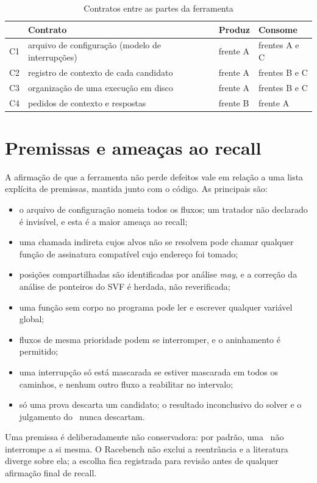 \begin{table}[htb]
  \centering
  \caption{Contratos entre as partes da ferramenta}
  \label{tab:contratos}
  \begin{tabular}{@{}llll@{}}
    \toprule
    & Contrato & Produz & Consome \\
    \midrule
    C1 & arquivo de configuração (modelo de interrupções) & frente A & frentes A e C \\
    C2 & registro de contexto de cada candidato & frente A & frentes B e C \\
    C3 & organização de uma execução em disco & frente A & frentes B e C \\
    C4 & pedidos de contexto e respostas & frente B & frente A \\
    \bottomrule
  \end{tabular}
\end{table}

\section{Premissas e ameaças ao recall}
\label{sec:premissas}

A afirmação de que a ferramenta não perde defeitos vale em relação a uma lista
explícita de premissas, mantida junto com o código. As principais são:

\begin{itemize}
  \item o arquivo de configuração nomeia todos os fluxos; um tratador não
    declarado é invisível, e esta é a maior ameaça ao recall;
  \item uma chamada indireta cujos alvos não se resolvem pode chamar qualquer
    função de assinatura compatível cujo endereço foi tomado;
  \item posições compartilhadas são identificadas por análise \textit{may}, e a
    correção da análise de ponteiros do SVF é herdada, não reverificada;
  \item uma função sem corpo no programa pode ler e escrever qualquer variável
    global;
  \item fluxos de mesma prioridade podem se interromper, e o aninhamento é
    permitido;
  \item uma interrupção só está mascarada se estiver mascarada em todos os
    caminhos, e nenhum outro fluxo a reabilitar no intervalo;
  \item só uma prova descarta um candidato; o resultado inconclusivo do solver e
    o julgamento do \llm\ nunca descartam.
\end{itemize}

Uma premissa é deliberadamente não conservadora: por padrão, uma \isr\
não interrompe a si mesma. O Racebench não exclui a reentrância e a literatura
diverge sobre ela; a escolha fica registrada para revisão antes de qualquer
afirmação final de recall.
